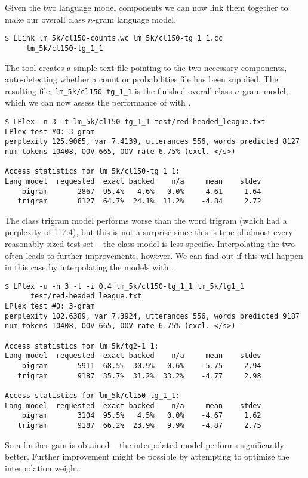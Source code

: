 Given the two language model components we can now link them together
to make our overall class $n$-gram language model.
\begin{verbatim}
$ LLink lm_5k/cl150-counts.wc lm_5k/cl150-tg_1_1.cc
     lm_5k/cl150-tg_1_1
\end{verbatim} %

The  tool creates a simple text file pointing to the two
necessary components, auto-detecting whether a count or probabilities
file has been supplied.  The resulting file, {\tt lm\_5k/cl150-tg\_1\_1}
is the finished overall class $n$-gram model, which we can now assess
the performance of with .
\begin{verbatim}
$ LPlex -n 3 -t lm_5k/cl150-tg_1_1 test/red-headed_league.txt
LPlex test #0: 3-gram
perplexity 125.9065, var 7.4139, utterances 556, words predicted 8127
num tokens 10408, OOV 665, OOV rate 6.75% (excl. </s>)

Access statistics for lm_5k/cl150-tg_1_1:
Lang model  requested  exact backed    n/a     mean    stdev
    bigram       2867  95.4%   4.6%   0.0%    -4.61     1.64
   trigram       8127  64.7%  24.1%  11.2%    -4.84     2.72
\end{verbatim} %

The class trigram model performs worse than the word trigram (which
had a perplexity of 117.4), but this is not a surprise since this is
true of almost every reasonably-sized test set -- the class model is
less specific.  Interpolating the two often leads to further
improvements, however.  We can find out if this will happen in this
case by interpolating the models with .
\begin{verbatim}
$ LPlex -u -n 3 -t -i 0.4 lm_5k/cl150-tg_1_1 lm_5k/tg1_1
      test/red-headed_league.txt
LPlex test #0: 3-gram
perplexity 102.6389, var 7.3924, utterances 556, words predicted 9187
num tokens 10408, OOV 665, OOV rate 6.75% (excl. </s>)
 
Access statistics for lm_5k/tg2-1_1:
Lang model  requested  exact backed    n/a     mean    stdev
    bigram       5911  68.5%  30.9%   0.6%    -5.75     2.94
   trigram       9187  35.7%  31.2%  33.2%    -4.77     2.98
 
Access statistics for lm_5k/cl150-tg_1_1:
Lang model  requested  exact backed    n/a     mean    stdev
    bigram       3104  95.5%   4.5%   0.0%    -4.67     1.62
   trigram       9187  66.2%  23.9%   9.9%    -4.87     2.75
\end{verbatim} %
So a further gain is obtained -- the interpolated model performs
significantly better.  Further improvement might be possible by
attempting to optimise the interpolation weight.

